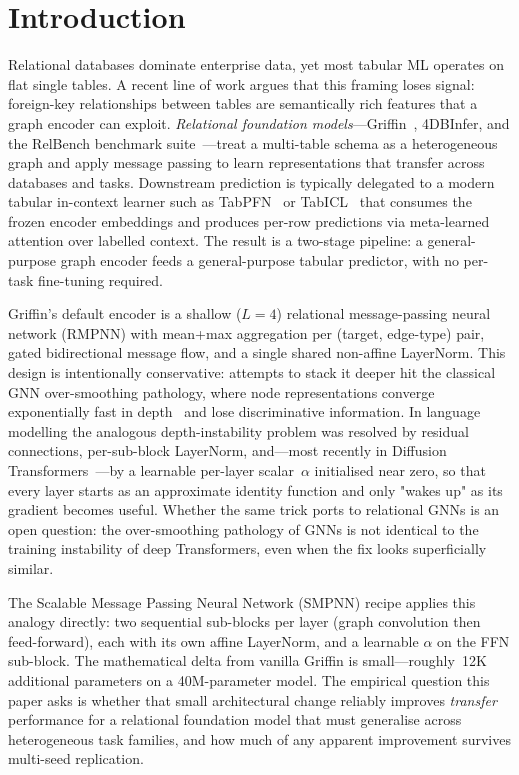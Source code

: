 \documentclass{article}
\begin{document}
\section{Introduction}
\label{sec:intro}

Relational databases dominate enterprise data, yet most tabular ML operates on flat single tables. A recent line of work argues that this framing loses signal: foreign-key relationships between tables are semantically rich features that a graph encoder can exploit. \emph{Relational foundation models}---Griffin~\citep{wang2025griffin}, 4DBInfer, and the RelBench benchmark suite~\citep{robinson2024relbench}---treat a multi-table schema as a heterogeneous graph and apply message passing to learn representations that transfer across databases and tasks. Downstream prediction is typically delegated to a modern tabular in-context learner such as TabPFN~\citep{hollmann2024tabpfn} or TabICL~\citep{qu2024tabicl} that consumes the frozen encoder embeddings and produces per-row predictions via meta-learned attention over labelled context. The result is a two-stage pipeline: a general-purpose graph encoder feeds a general-purpose tabular predictor, with no per-task fine-tuning required.

Griffin's default encoder is a shallow ($L{=}4$) relational message-passing neural network (RMPNN) with mean+max aggregation per (target, edge-type) pair, gated bidirectional message flow, and a single shared non-affine LayerNorm. This design is intentionally conservative: attempts to stack it deeper hit the classical GNN over-smoothing pathology, where node representations converge exponentially fast in depth~\citep{oono2020oversmoothing} and lose discriminative information. In language modelling the analogous depth-instability problem was resolved by residual connections, per-sub-block LayerNorm, and---most recently in Diffusion Transformers~\citep{peebles2023dit}---by a learnable per-layer scalar~$\alpha$ initialised near zero, so that every layer starts as an approximate identity function and only "wakes up" as its gradient becomes useful. Whether the same trick ports to relational GNNs is an open question: the over-smoothing pathology of GNNs is not identical to the training instability of deep Transformers, even when the fix looks superficially similar.

The Scalable Message Passing Neural Network (SMPNN) recipe applies this analogy directly: two sequential sub-blocks per layer (graph convolution then feed-forward), each with its own affine LayerNorm, and a learnable $\alpha$ on the FFN sub-block. The mathematical delta from vanilla Griffin is small---roughly~12K additional parameters on a 40M-parameter model. The empirical question this paper asks is whether that small architectural change reliably improves \emph{transfer} performance for a relational foundation model that must generalise across heterogeneous task families, and how much of any apparent improvement survives multi-seed replication.
\end{document}
